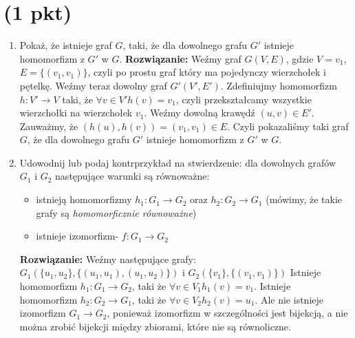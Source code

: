 \documentclass{article}
\begin{document}
\section{(1 pkt)}
\begin{enumerate}
        \item Pokaż, że istnieje graf $G$, taki, że dla dowolnego grafu $G'$ istnieje homomorfizm z $G'$ w $G$.
        \newline \textbf{Rozwiązanie:}
        Weźmy graf $G(V, E)$, gdzie $V={v_1}$, $E=\{(v_1, v_1)\}$, czyli po prostu graf który ma pojedynczy wierzchołek i pętelkę. Weźmy teraz dowolny graf $G'(V', E')$. Zdefiniujmy homomorfizm $h : V' \rightarrow V$ taki, że $\forall v \in V' h(v) = v_1$, czyli przekształcamy wszystkie wierzchołki na wierzchołek $v_1$. Weźmy dowolną krawędź $(u, v) \in E'$. Zauważmy, że $(h(u), h(v)) = (v_1, v_1) \in E$. Czyli pokazaliśmy taki graf $G$, że dla dowolnego grafu $G'$ istnieje homomorfizm z $G'$ w $G$.

        \item Udowodnij lub podaj kontrprzykład na stwierdzenie: dla dowolnych grafów $G_1$ i $G_2$ następujące warunki są równoważne:
        \begin{itemize}
                \item istnieją homomorfizmy $h_1 : G_1 \rightarrow G_2$ oraz $h_2 : G_2 \rightarrow G_1$ (mówimy, że takie grafy są \textit{homomorficznie równoważne})
                \item istnieje izomorfizm- $f : G_1 \rightarrow G_2$
        \end{itemize}
        \textbf{Rozwiązanie:} Weźmy następujące grafy: \newline
        $G_1(\{u_1, u_2\}, \{(u_1, u_1), (u_1, u_2)\})$ i $G_2(\{v_1\}, \{(v_1, v_1)\})$
        \newline Istnieje homomorfizm $h_1 : G_1 \rightarrow G_2$, taki że
        $\forall v \in V_1 h_1(v)=v_1$.
        \newline Istnieje homomorfizm $h_2 : G_2 \rightarrow G_1$, taki że
        $\forall v \in V_2 h_2(v)=u_1$.
        \newline Ale nie istnieje izomorfizm $G_1 \rightarrow G_2$, ponieważ izomorfizm w szczególności jest bijekcją, a nie można zrobić bijekcji między zbiorami, które nie są równoliczne.
\end{enumerate}
\end{document}

